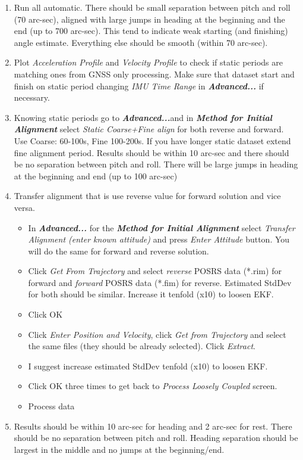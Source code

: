 \documentclass[british]{book}
\begin{document}
\begin{enumerate}
	\item Run all automatic. There should be small separation between pitch and roll (70 arc-sec), aligned with large jumps in heading at the beginning and the end (up to 700 arc-sec). This tend to indicate weak starting (and finishing) angle estimate. Everything else should be smooth (within 70 arc-sec).
	\item Plot \emph{Acceleration Profile} and \emph{Velocity Profile} to check if static periods are matching ones from GNSS only processing. Make sure that dataset start and finish on static period changing \textit{IMU Time Range} in \textbf{\emph{Advanced...}} if necessary.
	\item Knowing static periods go to \textbf{\emph{Advanced...}}and in \textbf{\emph{Method for Initial Alignment}} select \emph{Static Coarse+Fine align} for both reverse and forward. Use Coarse: 60-100s, Fine 100-200s. If you have longer static dataset extend fine alignment period. Results should be within 10 arc-sec and there should be no separation between pitch and roll. There will be large jumps in heading at the beginning and end (up to 100 arc-sec) 
	\item Transfer alignment that is use reverse value for forward solution and vice versa.
	\begin{itemize}
		\item In \textbf{\emph{Advanced...}} for the \textbf{\emph{Method for Initial Alignment}} select \emph{Transfer Alignment (enter known attitude) }and press\emph{ Enter Attitude }button. You will do the same for forward and reverse solution.
		\item Click \emph{Get From Trajectory }and select \emph{reverse} POSRS data ({*}.rim) for forward and \emph{forward} POSRS data ({*}.fim) for reverse. Estimated StdDev for both should be similar. Increase it tenfold (x10) to loosen EKF. 
		\item Click OK
		\item Click \emph{Enter Position and Velocity}, click \emph{ Get from Trajectory} and select the same files (they should be already selected). Click \emph{Extract}.
		\item I suggest increase estimated StdDev tenfold (x10) to loosen EKF. 
		\item Click OK three times to get back to \emph{Process Loosely Coupled} screen.
		\item Process data
	\end{itemize}
	\item Results should be within 10 arc-sec for heading and 2 arc-sec for rest. There should be no separation between pitch and roll. Heading separation should be largest in the middle and no jumps at the beginning/end. 
\end{enumerate}
\end{document}
